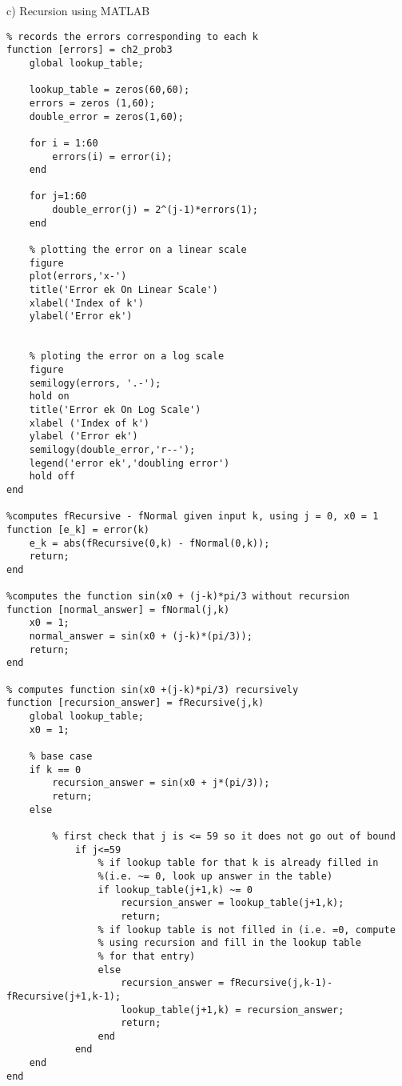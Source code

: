 \documentclass{article}
\begin{document}
\newpage
c) Recursion using MATLAB
\begin{lstlisting}
% records the errors corresponding to each k
function [errors] = ch2_prob3
    global lookup_table;
    
    lookup_table = zeros(60,60);
    errors = zeros (1,60);
    double_error = zeros(1,60);
    
    for i = 1:60
        errors(i) = error(i);
    end
    
    for j=1:60
        double_error(j) = 2^(j-1)*errors(1);
    end
    
    % plotting the error on a linear scale
    figure
    plot(errors,'x-')
    title('Error ek On Linear Scale')
    xlabel('Index of k')
    ylabel('Error ek') 
    
    
    % ploting the error on a log scale
    figure
    semilogy(errors, '.-');
    hold on
    title('Error ek On Log Scale')
    xlabel ('Index of k')
    ylabel ('Error ek')
    semilogy(double_error,'r--');
    legend('error ek','doubling error')
    hold off
end

%computes fRecursive - fNormal given input k, using j = 0, x0 = 1
function [e_k] = error(k)
    e_k = abs(fRecursive(0,k) - fNormal(0,k));
    return;
end

%computes the function sin(x0 + (j-k)*pi/3 without recursion
function [normal_answer] = fNormal(j,k)
    x0 = 1;
    normal_answer = sin(x0 + (j-k)*(pi/3));
    return;
end

% computes function sin(x0 +(j-k)*pi/3) recursively
function [recursion_answer] = fRecursive(j,k)
    global lookup_table;
    x0 = 1;
    
    % base case
    if k == 0                           
        recursion_answer = sin(x0 + j*(pi/3));
        return;
    else
        
        % first check that j is <= 59 so it does not go out of bound
            if j<=59
                % if lookup table for that k is already filled in 
                %(i.e. ~= 0, look up answer in the table)
                if lookup_table(j+1,k) ~= 0
                    recursion_answer = lookup_table(j+1,k);
                    return;
                % if lookup table is not filled in (i.e. =0, compute 
                % using recursion and fill in the lookup table 
                % for that entry)
                else
                    recursion_answer = fRecursive(j,k-1)-fRecursive(j+1,k-1);
                    lookup_table(j+1,k) = recursion_answer;
                    return;
                end
            end
    end
end
\end{lstlisting}
\end{document}
